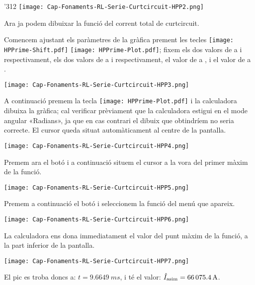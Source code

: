 \begin{exemple}
\begin{dingautolist}{'312}
            \texttt{[image: Cap-Fonaments-RL-Serie-Curtcircuit-HPP2.png]}

        \item Ara ja podem dibuixar la funció del corrent total de curtcircuit.

            Comencem ajustant els paràmetres de la gràfica prement les tecles \texttt{[image: HPPrime-Shift.pdf]} \texttt{[image: HPPrime-Plot.pdf]}; fixem els dos valors de  a  i  respectivament, els dos valors de  a  i  respectivament, el valor de  a , i el valor de  a .

            \texttt{[image: Cap-Fonaments-RL-Serie-Curtcircuit-HPP3.png]}
            \break

        \item A continuació premem la tecla \texttt{[image: HPPrime-Plot.pdf]} i la calculadora dibuixa la gràfica; cal verificar prèviament que la calculadora estigui en el mode angular «Radians», ja que en cas contrari el dibuix que obtindríem no seria correcte. El cursor queda situat automàticament al centre de la pantalla.

            \texttt{[image: Cap-Fonaments-RL-Serie-Curtcircuit-HPP4.png]}

        \item Premem ara el botó  i a continuació situem el cursor  a la vora del primer màxim de la funció.

            \texttt{[image: Cap-Fonaments-RL-Serie-Curtcircuit-HPP5.png]}

        \item Premem a continuació el botó  i seleccionem la funció  del menú que apareix.

            \texttt{[image: Cap-Fonaments-RL-Serie-Curtcircuit-HPP6.png]}

        \item La calculadora ens dona immediatament el valor del punt màxim de la funció, a la part inferior de la pantalla.

            \texttt{[image: Cap-Fonaments-RL-Serie-Curtcircuit-HPP7.png]}

            El pic es troba doncs a: $t=\qty{9,6649}{ms}$, i té el valor:  $\hat{I}_\mathrm{asim}=\qty{66075,4}{A}$.
    \end{dingautolist}

\end{exemple}


